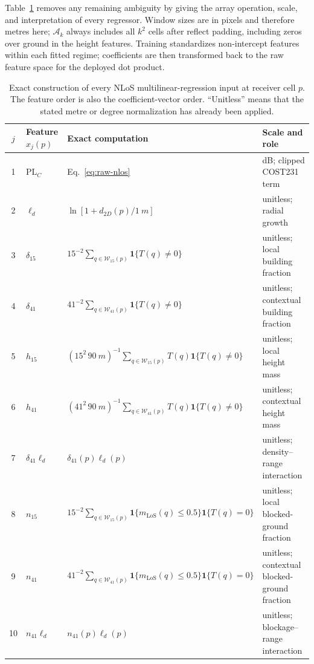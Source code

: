\documentclass[10pt,conference]{IEEEtran}
\begin{document}
Table~\ref{tab:all-nlos-terms} removes any remaining ambiguity by giving the
array operation, scale, and interpretation of every regressor. Window sizes
are in pixels and therefore metres here; $\mathcal A_k$ always includes all
$k^2$ cells after reflect padding, including zeros over ground in the height
features. Training standardizes non-intercept features within each fitted
regime; coefficients are then transformed back to the raw feature space for
the deployed dot product.

\begin{table}[!t]
\centering
\caption{Exact construction of every NLoS multilinear-regression input at
receiver cell $p$. The feature order is also the coefficient-vector order.
``Unitless'' means that the stated metre or degree normalization has already
been applied.}
\label{tab:all-nlos-terms}
\scriptsize
\renewcommand{\arraystretch}{0.94}
\setlength{\tabcolsep}{3.5pt}
\begin{tabularx}{\textwidth}{c l X l}
\toprule
$j$ & Feature $x_j(p)$ & Exact computation & Scale and role \\
\midrule
1 & $\mathrm{PL}_{C}$ & Eq.~\eqref{eq:raw-nlos} & \si{dB}; clipped COST231 term \\
2 & $\ell_d$ & $\ln[1+d_{2D}(p)/\SI{1}{m}]$ & unitless; radial growth \\
3 & $\delta_{15}$ & $15^{-2}\sum_{q\in\mathcal W_{15}(p)}\mathbf 1\{T(q)\ne0\}$ & unitless; local building fraction \\
4 & $\delta_{41}$ & $41^{-2}\sum_{q\in\mathcal W_{41}(p)}\mathbf 1\{T(q)\ne0\}$ & unitless; contextual building fraction \\
5 & $h_{15}$ & $(15^2\,\SI{90}{m})^{-1}\sum_{q\in\mathcal W_{15}(p)}T(q)\mathbf 1\{T(q)\ne0\}$ & unitless; local height mass \\
6 & $h_{41}$ & $(41^2\,\SI{90}{m})^{-1}\sum_{q\in\mathcal W_{41}(p)}T(q)\mathbf 1\{T(q)\ne0\}$ & unitless; contextual height mass \\
7 & $\delta_{41}\ell_d$ & $\delta_{41}(p)\ell_d(p)$ & unitless; density--range interaction \\
8 & $n_{15}$ & $15^{-2}\sum_{q\in\mathcal W_{15}(p)}\mathbf 1\{m_{\mathrm{LoS}}(q)\le0.5\}\mathbf 1\{T(q)=0\}$ & unitless; local blocked-ground fraction \\
9 & $n_{41}$ & $41^{-2}\sum_{q\in\mathcal W_{41}(p)}\mathbf 1\{m_{\mathrm{LoS}}(q)\le0.5\}\mathbf 1\{T(q)=0\}$ & unitless; contextual blocked-ground fraction \\
10 & $n_{41}\ell_d$ & $n_{41}(p)\ell_d(p)$ & unitless; blockage--range interaction \\

\end{tabularx}
\end{table}
\end{document}
